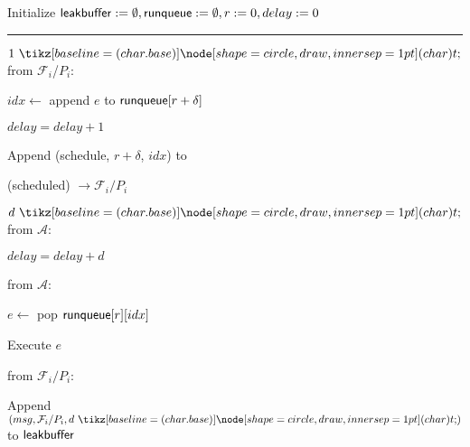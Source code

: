 \begin{bbox}[title={\textbf{Wrapper} $\mathcal{W}_{\msf{sync}}$}]

Initialize ${\mathsf {leakbuffer}} := \emptyset, {\mathsf {runqueue}} := \emptyset, r := 0, delay := 0$

\vspace{2mm} \hrule \vspace{2mm}


\OnInput {} $1 \token$ from $\mathcal{F}_i$/$P_i$:

	\begin{renumerate}

	\item $idx \leftarrow$ append $e$ to ${\mathsf {runqueue}}[r+ \delta]$

	\item $delay = delay + 1$

	\item Append (schedule, $r + \delta$, $idx$) to 

	\item \Send (scheduled) $\rightarrow \mathcal{F}_i/P_i$
	\end{renumerate}

\OnInput {} $d \token$ from $\mathcal{A}$:

	\begin{renumerate}
	\item $delay = delay + d$
	\end{renumerate}

\OnInput {} from $\mathcal{A}$:
	\begin{renumerate}	
	\item $e \leftarrow$ pop ${\mathsf {runqueue}}[r][idx]$
	\item Execute $e$
	\end{renumerate}

\OnInput {} from $\mathcal{F}_i/P_i$:
	\begin{renumerate}
	\item Append $(msg, \mathcal{F}_i/P_i, d \token)$ to ${\mathsf {leakbuffer}}$
	\end{renumerate}


\end{bbox}
